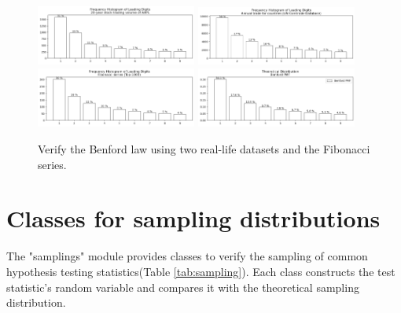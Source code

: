 \documentclass[11pt, letterpaper]{article}
\begin{document}
\begin{figure}[htbp]
    \centering
    \includegraphics[width=0.47\textwidth]{fig6-benford mc1.png}
    \includegraphics[width=0.47\textwidth]{fig6-benford mc2.png}
    \includegraphics[width=0.47\textwidth]{fig6-benford mc3.png}
    \includegraphics[width=0.47\textwidth]{fig6-benford mc4.png}
    \caption{Verify the Benford law using two real-life datasets and the Fibonacci series.}
    \label{fig:benford mc}
\end{figure}

\vspace{-1em}
\section{Classes for sampling distributions}
The "samplings" module provides classes to verify the sampling of common hypothesis testing statistics(Table \ref{tab:sampling}).
Each class constructs the test statistic's random variable and compares it with the theoretical sampling distribution.
\end{document}
